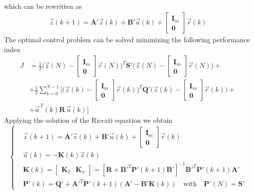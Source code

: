 \documentclass[12pt,a4paper,oneside]{book}
\begin{document}
\begin{onehalfspace}
\begin{equation}
\begin{aligned}
	\end{aligned} 
\end{equation}
which can be rewritten as 
\begin{equation}\label{lqi_a}
	\begin{aligned}
		\vec{z}(k+1) = \mathbf{A'} \vec{z}(k) + \mathbf{B'} \vec{u}(k) + 
		\begin{bmatrix} \mathbf{I}_m \\ \mathbf{0} \end{bmatrix} \vec{r}(k)
	\end{aligned} 
\end{equation}
The optimal control problem can be solved minimizing the following performance 
index
\begin{equation}\label{lqi_cost1}
	\begin{aligned}
		J &= \frac{1}{2}\Big(\vec{z}(N)-\begin{bmatrix} \mathbf{I}_m \\ 
			\mathbf{0} 
		\end{bmatrix}\vec{r}(N)\Big)^T\mathbf{S'}\Big(\vec{z}(N)-\begin{bmatrix}
			\mathbf{I}_m \\ \mathbf{0} \end{bmatrix}\vec{r}(N)\Big) + \\[6pt]
		&+\frac{1}{2}\sum_{k=0}^{N-1}\Big[ \Big(\vec{z}(k)-\begin{bmatrix} 
			\mathbf{I}_m \\ \mathbf{0} 
		\end{bmatrix}\vec{r}(k)\Big)^T\mathbf{Q'}\Big(\vec{z}(k)-\begin{bmatrix}
			\mathbf{I}_m \\ \mathbf{0} \end{bmatrix}\vec{r}(k)\Big) +\\[6pt]
		&+ \vec{u}^{\,T}(k)\mathbf{R}\,\vec{u}(k)\Big]
	\end{aligned}
\end{equation}
Applying the solution of the Riccati equation we obtain
\begin{equation}
	\left\lbrace \begin{aligned}
		&\vec{z}(k+1) = \mathbf{A'} \vec{z}(k) + \mathbf{B'} \vec{u}(k) + 
		\begin{bmatrix} \mathbf{I}_m \\ \mathbf{0} \end{bmatrix} \vec{r}(k) 
		\\[6pt]
		& \vec{u}(k) = -\mathbf{K}(k)\vec{z}(k) \\[6pt]
		& \mathbf{K}(k) = \begin{bmatrix} \mathbf{K}_I & \mathbf{K}_x 
		\end{bmatrix} = \left[ 
		\mathbf{R}+\mathbf{B'}^T\mathbf{P'}(k+1)\mathbf{B'}\right]^{-1}\mathbf{B'}^T\mathbf{P'}(k+1)
		\mathbf{A'} \\[6pt]
		& \mathbf{P'}(k) =\mathbf{Q'}+\mathbf{A'}^T\mathbf{P'}(k+1)\left( 
		\mathbf{A'} -\mathbf{B'}\mathbf{K}(k)\right) \quad \text{with} \quad 
		\mathbf{P'}(N) =\mathbf{S'}
	\end{aligned}\right. 
\end{equation}


\end{onehalfspace}
\end{document}
